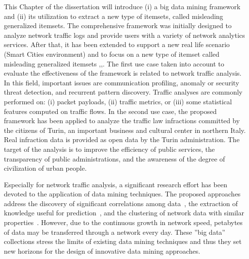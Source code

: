 

This Chapter of the dissertation will introduce (i) a big data mining framework and (ii) its utilization to extract a new type of itemsets, called misleading generalized itemsets.
The comprehensive framework was initially designed to analyze network traffic logs \cite{baralis2014nemico} and provide users with a variety of network analytics services. After that, it has been extended to support a new real life scenario (Smart Cities environment) and to focus on a new type of itemset called misleading generalized itemsets \cite{apiletti20143},\cite{6924449},\cite{DBLP:conf/sebd/BaralisCCCGPG14}.
The first use case taken into account to evaluate the effectiveness of the framework is related to network traffic analysis. In this field, important issues are communication profiling, anomaly or security threat detection, and recurrent pattern discovery.  
Traffic analyses are commonly performed on: (i) packet payloads, (ii) traffic metrics, or (iii) some statistical features computed on traffic flows. 
In the second use case, the proposed framework has been applied to analyze the traffic law infractions committed by 
the citizens of Turin, an important business and cultural center in northern Italy. 
Real infraction data is provided as open data by the Turin administration.
The target of the analysis is to improve the efficiency of public services, 
the transparency of public administrations, and the awareness of the degree of civilization of urban people.

Especially for network traffic analysis, a significant research effort has been devoted to the application of data mining techniques. The proposed approaches address
the discovery of significant correlations among data~\cite{NostroComNet,EGI}, the extraction of knowledge useful for prediction~\cite{KaragiannisPF05}, and 
the clustering of network data with similar properties~\cite{Erman05}.
However, due to the continuous growth in network speed, petabytes of data may be transferred through a network every day. 
These ''big data'' collections stress the limits of existing data mining techniques and thus they set new horizons for the design of innovative data mining approaches.
%

